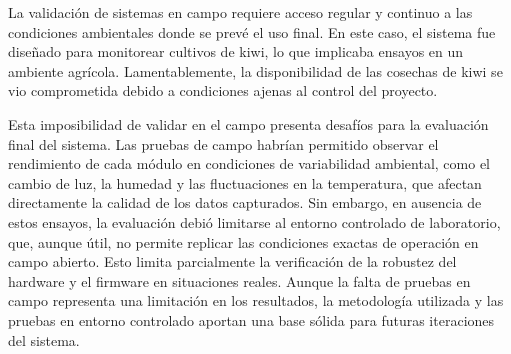 La validación de sistemas en campo requiere acceso regular y continuo a las condiciones ambientales donde se prevé el uso final. En este caso, el sistema fue diseñado para monitorear cultivos de kiwi, lo que implicaba ensayos en un ambiente agrícola. Lamentablemente, la disponibilidad de las cosechas de kiwi se vio comprometida debido a condiciones ajenas al control del proyecto.

Esta imposibilidad de validar en el campo presenta desafíos para la evaluación final del sistema. Las pruebas de campo habrían permitido observar el rendimiento de cada módulo en condiciones de variabilidad ambiental, como el cambio de luz, la humedad y las fluctuaciones en la temperatura, que afectan directamente la calidad de los datos capturados. Sin embargo, en ausencia de estos ensayos, la evaluación debió limitarse al entorno controlado de laboratorio, que, aunque útil, no permite replicar las condiciones exactas de operación en campo abierto. Esto limita parcialmente la verificación de la robustez del hardware y el firmware en situaciones reales. Aunque la falta de pruebas en campo representa una limitación en los resultados, la metodología utilizada y las pruebas en entorno controlado aportan una base sólida para futuras iteraciones del sistema.
